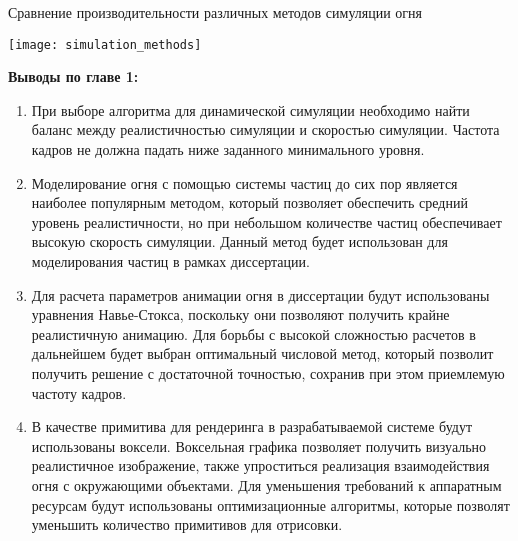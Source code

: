 \begin{table}[htb]
    \caption{Сравнение производительности различных методов симуляции огня}
    \texttt{[image: simulation\_methods]}
\end{table}

\textbf{Выводы по главе 1:}
\begin{enumerate}
    \item При выборе алгоритма для динамической симуляции необходимо найти
        баланс между реалистичностью симуляции и скоростью симуляции. Частота
        кадров не должна падать ниже заданного минимального уровня.
    \item Моделирование огня с помощью системы частиц до сих пор является
        наиболее популярным методом, который позволяет обеспечить средний
        уровень реалистичности, но при небольшом количестве частиц обеспечивает
        высокую скорость симуляции. Данный метод будет использован для
        моделирования частиц в рамках диссертации.
    \item Для расчета параметров анимации огня в диссертации будут использованы уравнения
        Навье-Стокса, поскольку они позволяют получить крайне реалистичную
        анимацию. Для борьбы с высокой сложностью расчетов в дальнейшем будет выбран
        оптимальный числовой метод, который позволит получить решение с
        достаточной точностью, сохранив при этом приемлемую частоту кадров.
    \item В качестве примитива для рендеринга в разрабатываемой системе
        будут использованы воксели. Воксельная графика позволяет получить
        визуально реалистичное изображение, также упроститься реализация
        взаимодействия огня с окружающими объектами. Для уменьшения требований к
        аппаратным ресурсам будут использованы оптимизационные алгоритмы,
        которые позволят уменьшить количество примитивов для отрисовки.
\end{enumerate}
